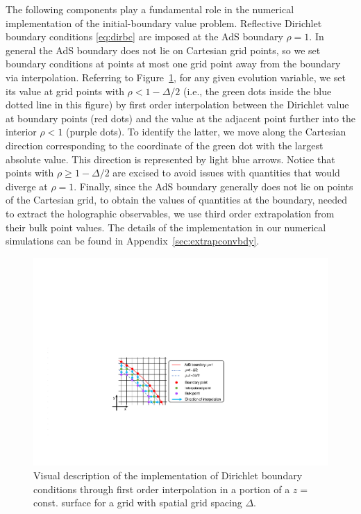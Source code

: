\documentclass[a4paper,11pt]{article}
\numberwithin{equation}{section}
\begin{document}
The following components play a fundamental role in the numerical implementation of the initial-boundary value problem.
Reflective Dirichlet boundary conditions \eqref{eq:dirbc} are imposed at the AdS boundary $\rho=1$.
In general the AdS boundary does not lie on Cartesian grid points, so we set boundary conditions at points at most one grid point away from the boundary via interpolation. Referring to Figure~\ref{fig:lego_circle_dirbc}, for any given evolution variable, we set its value at grid points with $\rho<1-\Delta/2$ (i.e., the green dots inside the blue dotted line in this figure) by first order interpolation between the Dirichlet value at boundary points (red dots) and the value at the adjacent point further into the interior $\rho<1$ (purple dots). To identify the latter, we move along the Cartesian direction corresponding to the coordinate of the green dot with the largest absolute value. This direction is represented by light blue arrows. Notice that points with $\rho\geq1-\Delta/2$ are excised to avoid issues with quantities that would diverge 
at $\rho=1$. Finally, since the AdS boundary generally does not lie on points of the Cartesian grid, to obtain the values of quantities at the boundary, needed to extract the holographic observables,  we use third order extrapolation from their bulk point values. 
The details of the implementation in our numerical simulations can be found in Appendix~\ref{sec:extrapconvbdy}.



\begin{figure}[t!]
        \centering
        \includegraphics[width=6.0in,clip=true]{plots/lego_circle/Dirichlet_conditions.pdf}
\parbox{5.0in}{\caption{Visual description of the implementation of Dirichlet boundary conditions through first order interpolation in a portion of a $z=$const. surface for a grid with spatial grid spacing $\Delta$.
        }\label{fig:lego_circle_dirbc}}
\end{figure}
\end{document}

